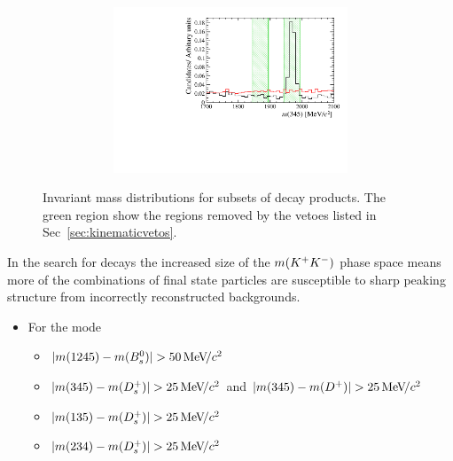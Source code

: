 \begin{figure}[!h]
\begin{subfigure}[t]{1.0\textwidth}
\begin{subfigure}[t]{0.32\textwidth}
         \includegraphics[width=1.0\textwidth]{figs/Selection/Veto_Comparison_B2DsPhi_Ds2KPiPi_m345.pdf}
      \end{subfigure}
      \caption{\decay{\Bp}{(\decay{\Dsp}{\Kp\pim\pip})\phiz}}
   \end{subfigure}

   \caption{Invariant mass distributions for subsets of decay products. The green region show the regions removed by the vetoes listed in Sec~\ref{sec:kinematicvetos}.}
   \label{fig:invariantmassvetoes}   
\end{figure}


In the search for \decay{\Bp}{\Dsp\Kp\Km} decays the increased size of the $m({{K}^+}{{K}^-})$ phase space means more of the combinations of final state particles are susceptible to sharp peaking structure from incorrectly reconstructed backgrounds.

\begin{itemize}
\item For the mode \decay{\Bp}{(\decay{\Dsp}{\Kp\Km\pip})\Kp\Km}
\begin{itemize}
\item $|m(\text{1245})- m({{B}^0_{s}})| > 50{\mathrm{\,Me\kern -0.1em V\!/}c^2}$
\item $|m(\text{345})- m({{D}^+_{s}})| > 25{\mathrm{\,Me\kern -0.1em V\!/}c^2}$ and $|m(\text{345})- m({{D}^+})| > 25{\mathrm{\,Me\kern -0.1em V\!/}c^2}$
\item $|m(\text{135})- m({{D}^+_{s}})| > 25{\mathrm{\,Me\kern -0.1em V\!/}c^2}$
\item $|m(\text{234})- m({{D}^+_{s}})| > 25{\mathrm{\,Me\kern -0.1em V\!/}c^2}$
\end{itemize}
\end{itemize}


